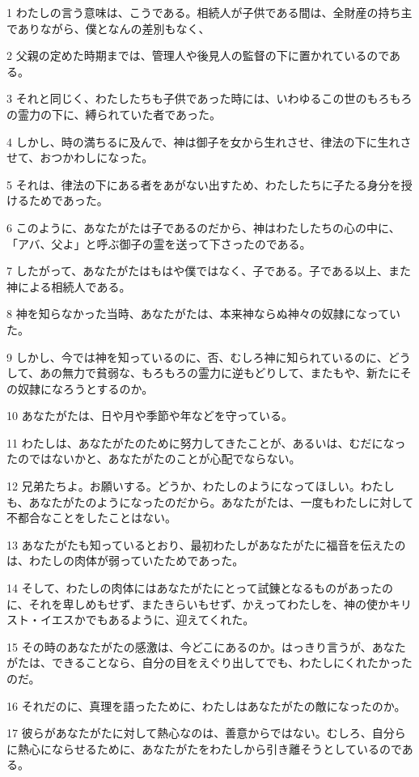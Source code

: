 \par 1 わたしの言う意味は、こうである。相続人が子供である間は、全財産の持ち主でありながら、僕となんの差別もなく、
\par 2 父親の定めた時期までは、管理人や後見人の監督の下に置かれているのである。
\par 3 それと同じく、わたしたちも子供であった時には、いわゆるこの世のもろもろの霊力の下に、縛られていた者であった。
\par 4 しかし、時の満ちるに及んで、神は御子を女から生れさせ、律法の下に生れさせて、おつかわしになった。
\par 5 それは、律法の下にある者をあがない出すため、わたしたちに子たる身分を授けるためであった。
\par 6 このように、あなたがたは子であるのだから、神はわたしたちの心の中に、「アバ、父よ」と呼ぶ御子の霊を送って下さったのである。
\par 7 したがって、あなたがたはもはや僕ではなく、子である。子である以上、また神による相続人である。
\par 8 神を知らなかった当時、あなたがたは、本来神ならぬ神々の奴隷になっていた。
\par 9 しかし、今では神を知っているのに、否、むしろ神に知られているのに、どうして、あの無力で貧弱な、もろもろの霊力に逆もどりして、またもや、新たにその奴隷になろうとするのか。
\par 10 あなたがたは、日や月や季節や年などを守っている。
\par 11 わたしは、あなたがたのために努力してきたことが、あるいは、むだになったのではないかと、あなたがたのことが心配でならない。
\par 12 兄弟たちよ。お願いする。どうか、わたしのようになってほしい。わたしも、あなたがたのようになったのだから。あなたがたは、一度もわたしに対して不都合なことをしたことはない。
\par 13 あなたがたも知っているとおり、最初わたしがあなたがたに福音を伝えたのは、わたしの肉体が弱っていたためであった。
\par 14 そして、わたしの肉体にはあなたがたにとって試錬となるものがあったのに、それを卑しめもせず、またきらいもせず、かえってわたしを、神の使かキリスト・イエスかでもあるように、迎えてくれた。
\par 15 その時のあなたがたの感激は、今どこにあるのか。はっきり言うが、あなたがたは、できることなら、自分の目をえぐり出してでも、わたしにくれたかったのだ。
\par 16 それだのに、真理を語ったために、わたしはあなたがたの敵になったのか。
\par 17 彼らがあなたがたに対して熱心なのは、善意からではない。むしろ、自分らに熱心にならせるために、あなたがたをわたしから引き離そうとしているのである。
